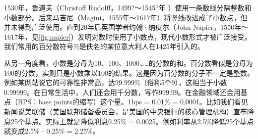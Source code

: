 \documentclass[b5paper]{ctexart}
\begin{document}
\begin{figure}[htbp]
 \centering
  \quad
\end{figure}

  
1530年，鲁道夫（Christoff Rudolff，1499?～1545?年 ）使用一条数线分隔整数和小数部分。后来马吉尼（Magini，1555年～1617年）将竖线改进成了小数点，但并未得到广泛使用。直到20年后英国学者约翰·纳皮尔（John Napier，1550年～1617年，见\cref{fig:napier}）发明对数时使用了小数点，现代小数形式才被广泛接受。我们常用的百分数符号\%是佚名的某位意大利人在1425年引入的。

从另一角度看，小数是分母为10、100、1000……的分数的和。百分数看似是分母为100的分数，实则只是小数乘以100的结果。这是因为百分数的分子不一定是整数。例如某网站说它的可靠性非常高，达99.999\%（俗称5个9），这相当于小数0.99999。在日常生活中，人们还会用千分数，写作999.99\textperthousand。在金融领域还会用基点（BPS：base points的缩写）这个量。1bps = 0.01\% = 0.0001。比如我们看见新闻说美联储（美国联邦储备委员会，是美国的中央银行的核心管理机构）宣布降息25个基点。实际上就是降低利息0.25\% = 0.0025。例如利率从2.5\%降低25个基点就变成2.5\% - 0.25\% = 2.25\%。
\end{document}
